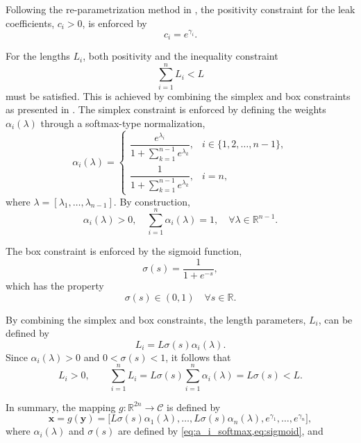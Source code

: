 Following the re-parametrization method in \cite{leplat2025}, the positivity constraint for the leak coefficients, $c_i > 0$, is enforced by
\begin{equation}
\label{eq:re_param_c}
c_i = e^{\gamma_i}.
\end{equation}

For the lengths $L_i$, both positivity and the inequality constraint
\begin{equation*}
\sum_{i=1}^n L_i < L
\end{equation*}
must be satisfied. This is achieved by combining the simplex and box constraints as presented in \cite{leplat2025}. The simplex constraint is enforced by defining the weights $\alpha_i(\lambda)$ through a softmax-type normalization,
\begin{equation}
\label{eq:a_i_softmax}
\alpha_i(\lambda)
=\begin{cases}
\dfrac{e^{\lambda_i}}{1+\sum_{k=1}^{n-1} e^{\lambda_k}}, & i\in\{1,2,\dots,n-1\},\\[16pt]
\dfrac{1}{1+\sum_{k=1}^{n-1} e^{\lambda_k}}, & i=n,
\end{cases}
\end{equation}
where $\lambda=[\lambda_1,\dots,\lambda_{n-1}]$.
By construction,
\begin{equation*}
\alpha_i(\lambda) > 0,
\quad
\sum_{i=1}^n \alpha_i(\lambda) = 1,
\quad \forall  \lambda \in \mathbb{R}^{n-1}.
\end{equation*}

The box constraint is enforced by the sigmoid function,
\begin{equation}
\label{eq:sigmoid}
\sigma(s) = \frac{1}{1 + e^{-s}},
\end{equation}
which has the property
\begin{equation*}
\sigma(s) \in (0,1) \quad \forall s \in \mathbb{R}.
\end{equation*}

By combining the simplex and box constraints, the length parameters, $L_i$, can be defined by
\begin{equation}
L_i = L \sigma(s) \alpha_i(\lambda).
\end{equation}
Since $\alpha_i(\lambda) > 0$ and $0 < \sigma(s) < 1$, it follows that
\begin{equation*}
L_i > 0,
\qquad
\sum_{i=1}^n L_i
= L \sigma(s) \sum_{i=1}^n \alpha_i(\lambda)
= L \sigma(s) < L.
\end{equation*}

In summary, the mapping $g : \mathbb{R}^{2n} \to \mathcal{C}$ is defined by
\begin{equation}
\label{eq:g_func}
\mathbf{x}=g(\mathbf{y})
=
\bigl[
L \sigma(s) \alpha_1(\lambda), \dots, L \sigma(s) \alpha_n(\lambda),
e^{\gamma_1}, \dots, e^{\gamma_n}
\bigr],
\end{equation}
where $\alpha_i(\lambda)$ and $\sigma(s)$ are defined by \cref{eq:a_i_softmax,eq:sigmoid}, and

